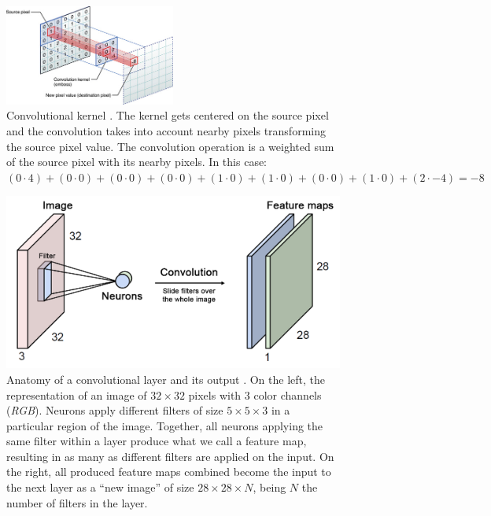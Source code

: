\begin{figure}[t]
  \begin{center}
    \includegraphics[width=0.5\textwidth]{gfx/kernel}
  \end{center}
  \caption{Convolutional kernel \cite{Apple}.
    The kernel gets centered on the source pixel and the convolution takes into account nearby pixels transforming the source pixel value.
    The convolution operation is a weighted sum of the source pixel with its nearby pixels. In this case:\\
    $(0\cdot4)+(0\cdot0)+(0\cdot0)
     +(0\cdot0)+(1\cdot0)+(1\cdot0)
     +(0\cdot0)+(1\cdot0)+(2\cdot-4) = -8$
  }
  \label{fig:sec:theory:covnets:kernel}
\end{figure}

\begin{figure}[t]
  \includegraphics[width=\textwidth]{gfx/conv-layer-2}
  \caption{
    Anatomy of a convolutional layer and its output \cite{Guerzhoy2016}.
    On the left, the representation of an image of ${32}\times{32}$ pixels with $3$ color channels (\emph{RGB}).
    Neurons apply different filters of size ${5}\times{5}\times{3}$ in a particular region of the image.
    Together, all neurons applying the same filter within a layer produce what we call a feature map, resulting in as many as different filters are applied on the input.
    On the right, all produced feature maps combined become the input to the next layer as a ``new image'' of size ${28}\times{28}\times{N}$, being $N$ the number of filters in the layer.
  }
  \label{fig:sec:theory:conv-layer-2}
\end{figure}

